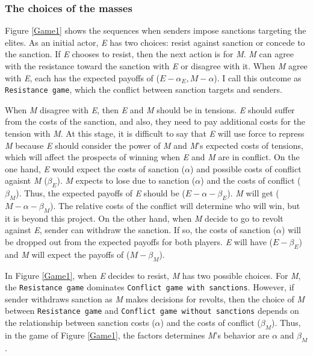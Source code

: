 \documentclass[11pt]{article}
\begin{document}
\begin{center}
	
\end{center}

\subsubsection*{The choices of the masses}

Figure \ref{Game1} shows the sequences when senders impose sanctions targeting the elites. As an initial actor, \textit{E} has two choices: resist against sanction or concede to the sanction. If \textit{E} chooses to resist, then the next action is for \textit{M}. \textit{M} can agree with the resistance toward the sanction with \textit{E} or disagree with it. When \textit{M} agree with \textit{E}, each has the expected payoffs of ($E - \alpha_E, M - \alpha$). I call this outcome as \texttt{Resistance game}, which the conflict between sanction targets and senders.
	
When \textit{M} disagree with \textit{E}, then \textit{E} and \textit{M} should be in tensions. \textit{E} should suffer from the costs of the sanction, and also, they need to pay additional costs for the tension with \textit{M}. At this stage, it is difficult to say that \textit{E} will use force to repress \textit{M} because \textit{E} should consider the power of \textit{M} and \textit{M}'s expected costs of tensions, which will affect the prospects of winning when \textit{E} and \textit{M} are in conflict. On the one hand, \textit{E} would expect the costs of sanction ($\alpha$) and possible costs of conflict agaisnt \textit{M} ($\beta_{E}$). \textit{M} expects to lose due to sanction ($\alpha$) and the costs of conflict ($\beta_{M}$). Thus, the expected payoffs of \textit{E} should be ($E - \alpha- \beta_{E}$). \textit{M} will get ($M-\alpha-\beta_{M}$). The relative costs of the conflict will determine who will win, but it is beyond this project. On the other hand, when \textit{M} decide to go to revolt against \textit{E}, sender can withdraw the sanction. If so, the costs of sanction ($\alpha$) will be dropped out from the expected payoffs for both players. \textit{E} will have ($E-\beta_{E}$) and \textit{M} will expect the payoffs of ($M-\beta_{M}$).

In Figure \ref{Game1}, when \textit{E} decides to resist, \textit{M} has two possible choices. For \textit{M}, the \texttt{Resistance game} dominates \texttt{Conflict game with sanctions}. However, if sender withdraws sanction as \textit{M} makes decisions for revolts, then the choice of \textit{M} between \texttt{Resistance game} and \texttt{Conflict game without sanctions} depends on the relationship between sanction costs ($\alpha$)  and the costs of conflict ($\beta_{M}$). Thus, in the game of Figure \ref{Game1}, the factors determines \textit{M}'s behavior are $\alpha$ and $\beta_{M}$.
\end{document}
